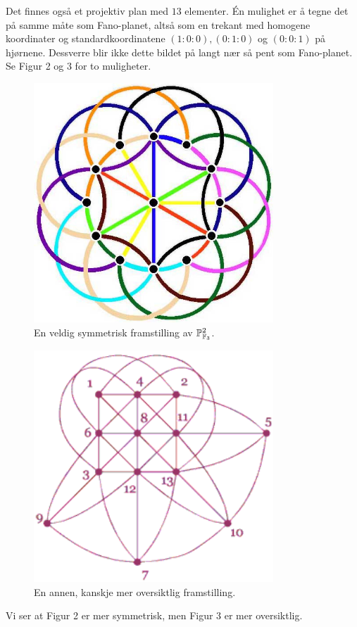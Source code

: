 \documentclass[11pt, norsk]{article}
\begin{document}
\begin{losn}
Det finnes også et projektiv plan med $13$ elementer. Én mulighet er å tegne det på samme måte som Fano-planet, altså som en trekant med homogene koordinater og standardkoordinatene $(1:0:0),(0:1:0)$ og $(0:0:1)$ på hjørnene. Dessverre blir ikke dette bildet på langt nær så pent som Fano-planet. Se Figur 2 og 3 for to muligheter.
\begin{figure}
  \centering
\includegraphics[width=90mm]{projplane13.jpg}
  \caption{En veldig symmetrisk framstilling av $\mathbb{P}^2_{\mathbb F_3}$.}
\end{figure}
\begin{figure}
\centering
\includegraphics[width=90mm]{proj132}
  \caption{En annen, kanskje mer oversiktlig framstilling.}
\end{figure}
Vi ser at Figur 2 er mer symmetrisk, men Figur 3 er mer oversiktlig. 
\end{losn}
\end{document}
